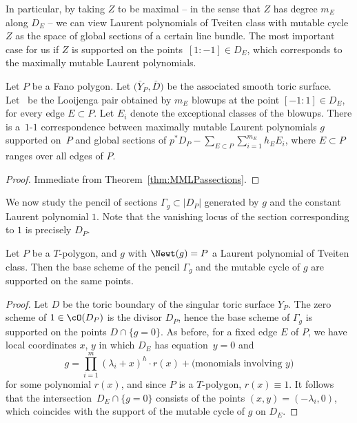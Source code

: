 In particular, by taking $Z$ to be maximal -- in the sense that $Z$ has degree $m_E$ along $D_E$ -- we can view Laurent polynomials of Tveiten class with mutable cycle $Z$ as the space of global sections of a certain line bundle. The most important case for us if $Z$ is supported on the points~${[1:-1] \in D_E}$, which corresponds to the maximally mutable Laurent polynomials.
	\begin{Corollary}
		Let $P$ be a Fano polygon. Let $\bigl(\bar{Y}_P, \bar{D}\bigr)$ be the associated smooth toric surface. Let~ be the Looijenga pair obtained by $m_E$ blowups at the point ${[-1:1] \in D_E}$, for every edge $E \subset P$. Let $E_i$ denote the exceptional classes of the blowups. There is a~$1$-$1$ correspondence between maximally mutable Laurent polynomials $g$ supported on~$P$ and global sections of
$p^*D_P-\sum_{E \subset P}\sum_{i=1}^{m_E} h_E E_i$,
		where $E \subset P$ ranges over all edges of $P$.
	\end{Corollary}
\begin{proof}
	Immediate from Theorem~\ref{thm:MMLPassections}.
\end{proof}

We now study the pencil of sections $\Gamma_g \subset |D_P|$ generated by $g$ and the constant Laurent polynomial $1$. Note that the vanishing locus of the section corresponding to $1$ is precisely $D_P$.
\begin{Lemma}\label{lem:baseschemevsmutablecycle}
	Let $P$ be a $T$-polygon, and $g$ with $\Newt(g)=P$ a Laurent polynomial of Tveiten class. Then the base scheme of the pencil $\Gamma_g$ and the mutable cycle of $g$ are supported on the same points.
\end{Lemma}
\begin{proof}
	Let $D$ be the toric boundary of the singular toric surface $Y_P$. The zero scheme of ${1 \in \cO(D_P)}$ is the divisor $D_P$, hence the base scheme of $\Gamma_g$ is supported on the points $D \cap \{g=0\}$. As before, for a fixed edge $E$ of $P$, we have local coordinates $x$, $y$ in which $D_E$ has equation~${y=0}$ and
	\[
	g=\prod_{i=1}^{m} (\lambda_i + x)^{h} \cdot r(x) +\text{(monomials involving $y$)}
	\]
	for some polynomial $r(x)$, and since $P$ is a $T$-polygon, $r(x) \equiv 1$. It follows that the intersection~${D_E \cap \{g=0\}}$ consists of the points $(x, y)=(-\lambda_i, 0)$, which coincides with the support of the mutable cycle of $g$ on $D_E$.
\end{proof}

